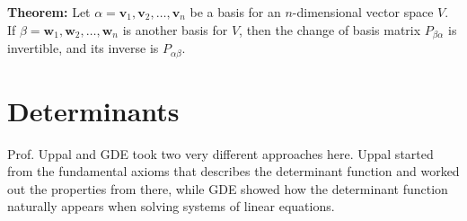 \documentclass{article}
\newcommand{\bff}[1]{\mathbf{#1}}
\begin{document}
\begin{minipage}[t]{.45\textwidth}
        \textbf{Theorem:} Let $\alpha=\bff{v}_1,\bff{v}_2,\dots, \bff{v}_n$ be a basis for an $n$-dimensional vector space $V$. If $\beta=\bff{w}_1,\bff{w}_2,\dots,\bff{w}_n$ is another basis for $V$, then the change of basis matrix $P_{\beta\alpha}$ is invertible, and its inverse is $P_{\alpha\beta}$.
    \end{minipage}
    \newpage
    \section{Determinants}
    Prof. Uppal and GDE took two very different approaches here. Uppal started from the fundamental axioms that describes the determinant function and worked out the properties from there, while GDE showed how the determinant function naturally appears when solving systems of linear equations.
    \vspace{2mm}
\end{document}
